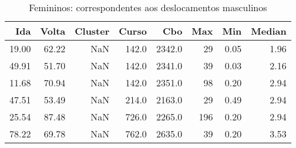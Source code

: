 \begin{table}
\centering
\caption{Femininos: correspondentes aos deslocamentos masculinos}
\label{tab:Salarios_Desequlibrio_F}
\begin{tabular}{rrrrrrrr}
\toprule
  Ida &  Volta &  Cluster &  Curso &    Cbo &  Max &  Min &  Median \\
\midrule
19.00 &  62.22 &      NaN &  142.0 & 2342.0 &   29 & 0.05 &    1.96 \\
49.91 &  51.70 &      NaN &  142.0 & 2341.0 &   39 & 0.03 &    2.16 \\
11.68 &  70.94 &      NaN &  142.0 & 2351.0 &   98 & 0.20 &    2.94 \\
47.51 &  53.49 &      NaN &  214.0 & 2163.0 &   29 & 0.49 &    2.94 \\
25.54 &  87.48 &      NaN &  726.0 & 2265.0 &  196 & 0.20 &    2.94 \\
78.22 &  69.78 &      NaN &  762.0 & 2635.0 &   39 & 0.20 &    3.53 \\
\bottomrule
\end{tabular}
\end{table}
